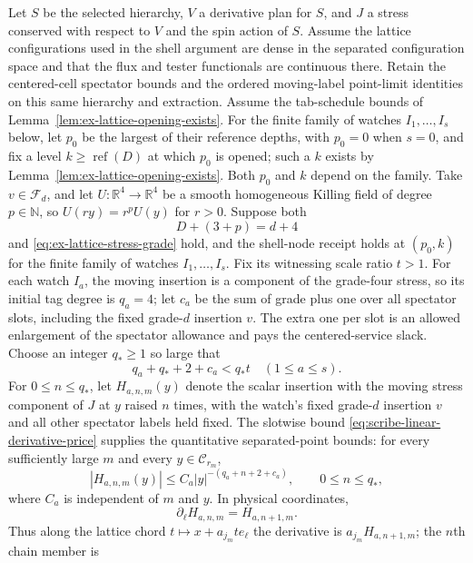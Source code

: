 \begin{lemma}
\label{lem:ex-lattice-annulus-annihilation}
Let $S$ be the selected hierarchy, $V$ a derivative plan for $S$, and $J$ a
stress conserved with respect to $V$ and the spin action of $S$.  Assume the
lattice configurations used in the shell argument are dense in the separated
configuration space and that the flux and tester functionals are continuous
there. Retain the centered-cell spectator bounds and the ordered
moving-label point-limit identities on this same hierarchy and extraction.
Assume the tab-schedule bounds of
Lemma~\ref{lem:ex-lattice-opening-exists}.  For the finite family of
watches $I_1,\ldots,I_s$ below, let $p_0$ be the largest of their reference
depths, with $p_0=0$ when $s=0$, and fix a level
$k\ge\operatorname{ref}(D)$ at which $p_0$ is
opened; such a $k$ exists by Lemma~\ref{lem:ex-lattice-opening-exists}.
Both $p_0$ and $k$ depend on the family.  Take $v\in\mathcal F_d$, and let
$U:\mathbb R^4\to\mathbb R^4$ be a smooth homogeneous Killing field of degree
$p\in\mathbb N$, so $U(ry)=r^pU(y)$ for $r>0$.  Suppose both
\begin{equation}\label{eq:ex-lattice-flux-grade}
  D+(3+p)=d+4
\end{equation}
and \eqref{eq:ex-lattice-stress-grade} hold, and the shell-node receipt
holds at $(p_0,k)$ for the finite family of watches
$I_1,\ldots,I_s$.  Fix its witnessing scale ratio $t>1$.  For each watch
$I_a$, the moving insertion is a component of the grade-four stress, so its
initial tag degree is $q_a=4$; let $c_a$ be the sum of grade plus one over all
spectator slots, including the fixed grade-$d$ insertion $v$.
The extra one per slot is an allowed enlargement of the spectator
allowance and pays the centered-service slack.  Choose an integer $q_*\geq1$ so large
that
\[
  q_a+q_*+2+c_a<q_*t
  \quad (1\leq a\leq s).
\]
For $0\leq n\leq q_*$, let $H_{a,n,m}(y)$ denote the scalar insertion with
the moving stress component of $J$ at $y$ raised $n$ times, with the watch's
fixed grade-$d$ insertion $v$ and all other spectator labels held fixed. The slotwise bound
\eqref{eq:scribe-linear-derivative-price} supplies the quantitative
separated-point bounds: for every sufficiently large $m$ and every
$y\in\mathcal C_{r_m}$,
\[
 |H_{a,n,m}(y)|\leq C_a|y|^{-(q_a+n+2+c_a)},
 \qquad 0\leq n\leq q_* ,
\]
where $C_a$ is independent of $m$ and $y$. In physical coordinates,
\[
 \partial_\ell H_{a,n,m}=H_{a,n+1,m}.
\]
Thus along the lattice chord
$t\mapsto x+a_{j_m}t e_\ell$ the derivative is
$a_{j_m}H_{a,n+1,m}$; the $n$th chain member is

\end{lemma}
